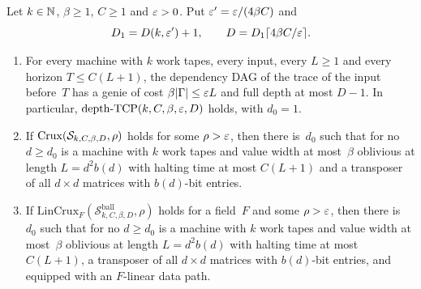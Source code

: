 \begin{corollary}\label{cor:oblivious}
Let $k\in\mathbb{N}$, $\beta\ge1$, $C\ge1$ and $\varepsilon>0$. Put $\varepsilon'=\varepsilon/(4\beta C)$ and
\[
  D_1=D(k,\varepsilon')+1,\qquad D=D_1\lceil4\beta C/\varepsilon\rceil .
\]
\begin{enumerate}[label=(\alph*)]
\item For every machine with $k$ work tapes, every input, every $L\ge1$ and every horizon $T\le C(L+1)$, the dependency DAG
of the trace of the input before~$T$ has a genie of cost $\beta\lvert \Gamma \rvert\le\varepsilon L$ and full depth at most $D-1$. In
particular, $\mathrm{depth}\text{-}\mathrm{TCP}(k,C,\beta,\varepsilon,D)$ holds, with $d_0=1$.
\item If $\mathrm{Crux}(\mathcal S_{k,C,\beta,D},\rho)$ holds for some $\rho>\varepsilon$, then there is~$d_0$ such that for no $d\ge d_0$ is a
machine with $k$ work tapes and value width at most~$\beta$ oblivious at length $L=d^2b(d)$ with halting time at most $C(L+1)$
and a transposer of all $d\times d$ matrices with $b(d)$-bit entries.
\item If $\mathrm{LinCrux}_F(\mathcal S^{\mathrm{ball}}_{k,C,\beta,D},\rho)$ holds for a field~$F$ and some $\rho>\varepsilon$, then there
is~$d_0$ such that for no $d\ge d_0$ is a machine with $k$ work tapes and value width at most~$\beta$ oblivious at length
$L=d^2b(d)$ with halting time at most $C(L+1)$, a transposer of all $d\times d$ matrices with $b(d)$-bit entries, and equipped
with an $F$-linear data path.
\end{enumerate}
\end{corollary}

